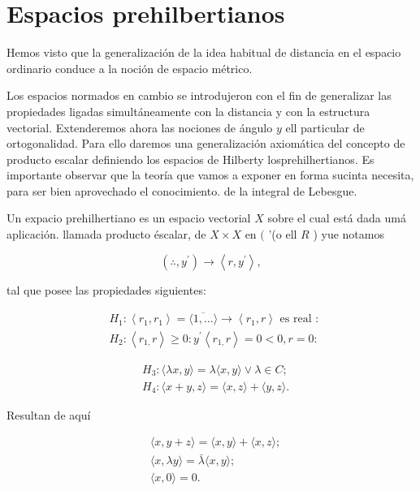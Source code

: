 \documentclass[10pt]{article}
\theoremstyle{plain}
\theoremstyle{definition}
\theoremstyle{remark}
\begin{document}
\section{Espacios prehilbertianos}
Hemos visto que la generalización de la idea habitual de distancia en el espacio ordinario conduce a la noción de espacio métrico.

Los espacios normados en cambio se introdujeron con el fin de generalizar las propiedades ligadas simultáneamente con la distancia y con la estructura vectorial. Extenderemos ahora las nociones de ángulo $y$ ell particular de ortogonalidad. Para ello daremos una generalización axiomática del concepto de producto escalar definiendo los espacios de Hilberty losprehilhertianos. Es importante observar que la teoría que vamos a exponer en forma sucinta necesita, para ser bien aprovechado el conocimiento. de la integral de Lebesgue.

Un expacio prehilhertiano es un espacio vectorial $X$ sobre el cual está dada umá aplicación. llamada producto éscalar, de $X \times X$ en $($ ’(o ell $R$ ) yue notamos

$$
\left(\therefore, y^{\prime}\right) \rightarrow\left\langle r, y^{\prime}\right\rangle,
$$

tal que posee las propiedades siguientes:

$$
\begin{aligned}
& H_{1}:\left\langle r_{1}, r_{1}\right\rangle=\langle\overline{1, \ldots}\rangle \rightarrow\left\langle r_{1}, r\right\rangle \text { es real : } \\
& H_{2}:\left\langle r_{1,} r\right\rangle \geqslant 0: y^{\prime}\left\langle r_{1,} r\right\rangle=0<0, r=0:
\end{aligned}
$$

$$
\begin{aligned}
& H_{3}:\langle\lambda x, y\rangle=\lambda\langle x, y\rangle \vee \lambda \in C ; \\
& H_{4}:\langle x+y, z\rangle=\langle x, z\rangle+\langle y, z\rangle .
\end{aligned}
$$

Resultan de aquí


\begin{align*}
& \langle x, y+z\rangle=\langle x, y\rangle+\langle x, z\rangle ;  \tag{3-1}\\
& \langle x, \lambda y\rangle=\bar{\lambda}\langle x, y\rangle ;  \tag{3-2}\\
& \langle x, 0\rangle=0 . \tag{$3\cdot3$}
\end{align*}
\end{document}
